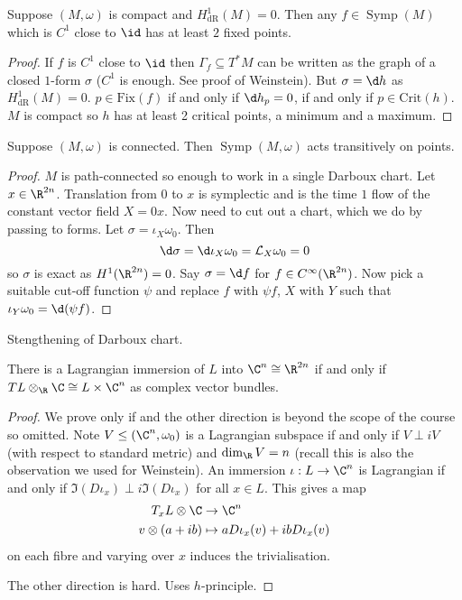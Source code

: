 \documentclass[a4paper]{article}
\DeclareMathOperator{\Symp}{Symp}
\begin{document}
\begin{corollary}
  Suppose \((M, \omega)\) is compact and \(H^1_{\mathrm{dR}}(M) = 0\). Then any \(f \in \Symp(M)\) which is \(C^1\) close to \(\id\) has at least \(2\) fixed points.
\end{corollary}

\begin{proof}
  If \(f\) is \(C^1\) close to \(\id\) then \(\Gamma_f \subseteq T^*M\) can be written as the graph of a closed \(1\)-form \(\sigma\) (\(C^1\) is enough. See proof of Weinstein). But \(\sigma = \d h\) as \(H^1_{\mathrm{dR}}(M) = 0\). \(p \in \mathrm{Fix}(f)\) if and only if \(\d h_p = 0\), if and only if \(p \in \mathrm{Crit}(h)\). \(M\) is compact so \(h\) has at least 2 critical points, a minimum and a maximum.
\end{proof}

\begin{proposition}
  Suppose \((M, \omega)\) is connected. Then \(\Symp(M, \omega)\) acts transitively on points.
\end{proposition}

\begin{proof}
  \(M\) is path-connected so enough to work in a single Darboux chart. Let \(x \in \R^{2n}\). Translation from \(0\) to \(x\) is symplectic and is the time \(1\) flow of the constant vector field \(X = 0x\). Now need to cut out a chart, which we do by passing to forms. Let \(\sigma = \iota_X \omega_0\). Then
  \[
    \d \sigma = \d \iota_X \omega_0 = \mathcal L_X \omega_0 = 0
  \]
  so \(\sigma\) is exact as \(H^1(\R^{2n}) = 0\). Say \(\sigma = \d f\) for \(f \in C^\infty(\R^{2n})\). Now pick a suitable cut-off function \(\psi\) and replace \(f\) with \(\psi f\), \(X\) with \(Y\) such that \(\iota_Y \omega_0 = \d (\psi f)\).
\end{proof}

Stengthening of Darboux chart.

\begin{theorem}
  There is a Lagrangian immersion of \(L\) into \(\C^n \cong \R^{2n}\) if and only if \(TL \otimes_\R \C \cong L \times \C^n\) as complex vector bundles.
\end{theorem}

\begin{proof}
  We prove only if and the other direction is beyond the scope of the course so omitted. Note \(V \leq (\C^n, \omega_0)\) is a Lagrangian subspace if and only if \(V \perp i V\) (with respect to standard metric) and \(\dim_\R V = n\) (recall this is also the observation we used for Weinstein). An immersion \(\iota: L \to \C^n\) is Lagrangian if and only if \(\Im (D \iota_x) \perp i \Im(D \iota_x)\) for all \(x \in L\). This gives a map
  \begin{align*}
    T_xL \otimes \C &\to \C^n \\
    v \otimes (a + ib) &\mapsto a D \iota_x(v) + i b D \iota_x (v)
  \end{align*}
  on each fibre and varying over \(x\) induces the trivialisation.

  The other direction is hard. Uses \(h\)-principle.
\end{proof}
\end{document}
